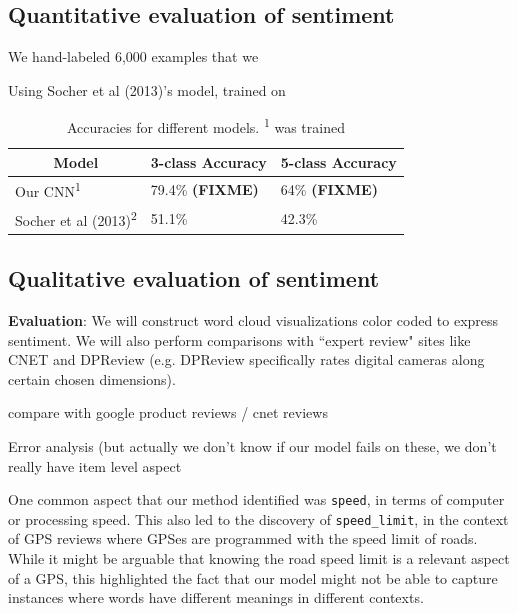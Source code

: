 \documentclass{article} %
\begin{document}


\subsection{Quantitative evaluation of sentiment}

We hand-labeled 6,000 examples that we 

Using Socher et al (2013)'s model, trained on 

\begin{table}[t]
\begin{center}
\begin{tabular}{lll}
\multicolumn{1}{c}{\bf Model}  &\multicolumn{1}{c}{\bf 3-class Accuracy} &\multicolumn{1}{c}{\bf 5-class Accuracy} \\ \hline
 Our CNN\textsuperscript{1} & 79.4\% \textbf{(FIXME)} & 64\% \textbf{(FIXME)} \\
 Socher et al (2013)\textsuperscript{2}       & 51.1\% & 42.3\% \\
\end{tabular}
\end{center}
\caption{Accuracies for different models. \textsuperscript{1} was trained}
\label{ModelResultsTable}
\end{table}



\subsection{Qualitative evaluation of sentiment}

\textbf{Evaluation}: We will construct word cloud visualizations color coded to express sentiment. We will also perform comparisons with ``expert review" sites like CNET and DPReview (e.g. DPReview specifically rates digital cameras along certain chosen dimensions).


compare with google product reviews / cnet reviews

Error analysis (but actually we don't know if our model fails on these, we don't really have item level aspect

One common aspect that our method identified was \texttt{speed}, in terms of computer or processing speed. This also led to the discovery of \texttt{speed\_limit}, in the context of GPS reviews where GPSes are programmed with the speed limit of roads. While it might be arguable that knowing the road speed limit is a relevant aspect of a GPS, this highlighted the fact that our model might not be able to capture instances where words have different meanings in different contexts.
\end{document}
